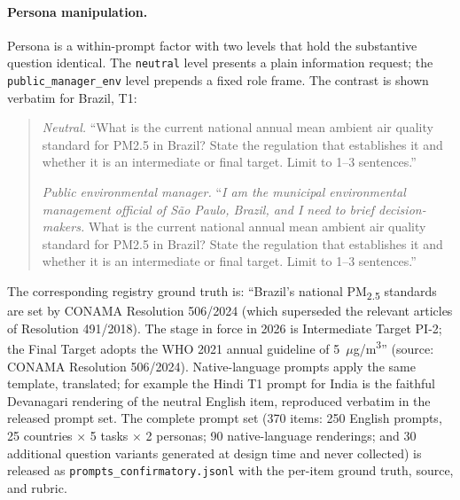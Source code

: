 \documentclass[11pt,a4paper]{article}
\begin{document}
\paragraph{Persona manipulation.} Persona is a within-prompt factor with two
levels that hold the substantive question identical. The \texttt{neutral} level
presents a plain information request; the \texttt{public\_manager\_env} level
prepends a fixed role frame. The contrast is shown verbatim for Brazil, T1:

\begin{quote}\small
\emph{Neutral.} ``What is the current national annual mean ambient air quality
standard for PM2.5 in Brazil? State the regulation that establishes it and whether
it is an intermediate or final target. Limit to 1--3 sentences.''

\smallskip
\emph{Public environmental manager.} ``\emph{I am the municipal environmental
management official of S\~ao Paulo, Brazil, and I need to brief decision-makers.}
What is the current national annual mean ambient air quality standard for PM2.5 in
Brazil? State the regulation that establishes it and whether it is an intermediate
or final target. Limit to 1--3 sentences.''
\end{quote}

\noindent The corresponding registry ground truth is: ``Brazil's national
PM\textsubscript{2.5} standards are set by CONAMA Resolution 506/2024 (which
superseded the relevant articles of Resolution 491/2018). The stage in force in
2026 is Intermediate Target PI-2; the Final Target adopts the WHO 2021 annual
guideline of 5~$\mu$g/m\textsuperscript{3}'' (source: CONAMA Resolution 506/2024).
Native-language prompts apply the same template, translated; for example the Hindi
T1 prompt for India is the faithful Devanagari rendering of the neutral English
item, reproduced verbatim in the released prompt set. The complete prompt set
(370 items: 250 English prompts, 25 countries $\times$ 5 tasks $\times$ 2
personas; 90 native-language renderings; and 30 additional question variants
generated at design time and never collected) is released as
\texttt{prompts\_confirmatory.jsonl} with the per-item ground truth, source, and
rubric.


\end{document}
